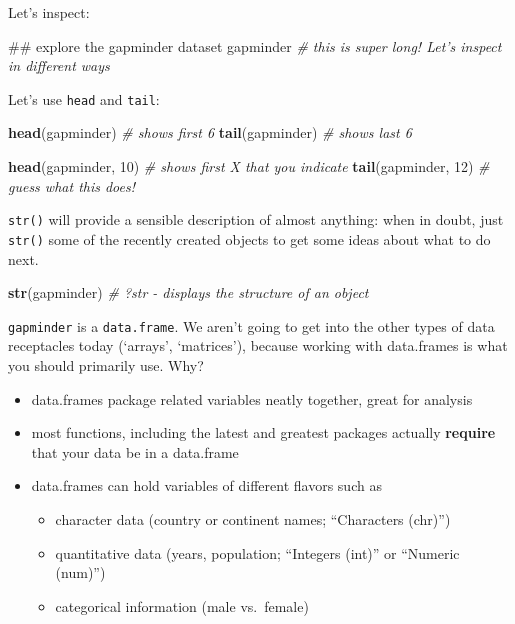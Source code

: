 \documentclass[]{book}
\newenvironment{Shaded}{\begin{snugshade}}{\end{snugshade}}
\newcommand{\KeywordTok}[1]{\textcolor[rgb]{0.13,0.29,0.53}{\textbf{{#1}}}}
\newcommand{\DecValTok}[1]{\textcolor[rgb]{0.00,0.00,0.81}{{#1}}}
\newcommand{\CommentTok}[1]{\textcolor[rgb]{0.56,0.35,0.01}{\textit{{#1}}}}
\newcommand{\NormalTok}[1]{{#1}}
\providecommand{\tightlist}{%
  \setlength{\itemsep}{0pt}\setlength{\parskip}{0pt}}
\theoremstyle{definition}
\theoremstyle{definition}
\theoremstyle{definition}
\theoremstyle{remark}
\begin{document}
Let's inspect:

\begin{Shaded}
\begin{Highlighting}[]
\NormalTok{## explore the gapminder dataset}
\NormalTok{gapminder }\CommentTok{# this is super long! Let's inspect in different ways}
\end{Highlighting}
\end{Shaded}

Let's use \texttt{head} and \texttt{tail}:

\begin{Shaded}
\begin{Highlighting}[]
\KeywordTok{head}\NormalTok{(gapminder) }\CommentTok{# shows first 6}
\KeywordTok{tail}\NormalTok{(gapminder) }\CommentTok{# shows last 6}

\KeywordTok{head}\NormalTok{(gapminder, }\DecValTok{10}\NormalTok{) }\CommentTok{# shows first X that you indicate}
\KeywordTok{tail}\NormalTok{(gapminder, }\DecValTok{12}\NormalTok{) }\CommentTok{# guess what this does!}
\end{Highlighting}
\end{Shaded}

\texttt{str()} will provide a sensible description of almost anything:
when in doubt, just \texttt{str()} some of the recently created objects
to get some ideas about what to do next.

\begin{Shaded}
\begin{Highlighting}[]
\KeywordTok{str}\NormalTok{(gapminder) }\CommentTok{# ?str - displays the structure of an object}
\end{Highlighting}
\end{Shaded}

\texttt{gapminder} is a \texttt{data.frame}. We aren't going to get into
the other types of data receptacles today (`arrays', `matrices'),
because working with data.frames is what you should primarily use. Why?

\begin{itemize}
\tightlist
\item
  data.frames package related variables neatly together, great for
  analysis
\item
  most functions, including the latest and greatest packages actually
  \textbf{require} that your data be in a data.frame
\item
  data.frames can hold variables of different flavors such as

  \begin{itemize}
  \tightlist
  \item
    character data (country or continent names; ``Characters (chr)'')
  \item
    quantitative data (years, population; ``Integers (int)'' or
    ``Numeric (num)'')
  \item
    categorical information (male vs.~female)
  \end{itemize}
\end{itemize}
\end{document}
